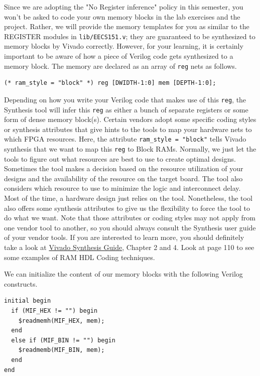 \documentclass[11pt]{article}
\begin{document}
{Since we are adopting the "No Register inference" policy in this semester, you won't be asked to code your own memory blocks in the lab exercises and the project. Rather, we will provide the memory templates for you as similar to the REGISTER modules in \verb|lib/EECS151.v|; they are guaranteed to be synthesized to memory blocks by Vivado correctly. However, for your learning, it is certainly important to be aware of how a piece of Verilog code gets synthesized to a memory block.
The memory are declared as an array of \verb|reg| nets as follows.

\begin{verbatim}
(* ram_style = "block" *) reg [DWIDTH-1:0] mem [DEPTH-1:0];
\end{verbatim}

Depending on how you write your Verilog code that makes use of this \verb|reg|, the Synthesis tool will infer this \verb|reg| as either a bunch of separate registers or some form of dense memory block(s). Certain vendors adopt some specific coding styles or synthesis attributes that give hints to the tools to map your hardware nets to which FPGA resources. Here, the attribute \verb|ram_style = "block"| tells Vivado synthesis that we want to map this \verb|reg| to Block RAMs. Normally, we just let the tools to figure out what resources are best to use to create optimal designs. Sometimes the tool makes a decision based on the resource utilization of your designs and the availability of the resource on the target board. The tool also considers which resource to use to minimize the logic and interconnect delay. Most of the time, a hardware design just relies on the tool. Nonetheless, the tool also offers some synthesis attributes to give us the flexibility to force the tool to do what we want. Note that those attributes or coding styles may not apply from one vendor tool to another, so you should always consult the Synthesis user guide of your vendor tools.
If you are interested to learn more, you should definitely take a look at \href{https://www.xilinx.com/support/documentation/sw_manuals/xilinx2019_2/ug901-vivado-synthesis.pdf}{Vivado Synthesis Guide}, Chapter 2 and 4. Look at page 110 to see some examples of RAM HDL Coding techniques.

We can initialize the content of our memory blocks with the following Verilog constructs.

\begin{verbatim}
initial begin
  if (MIF_HEX != "") begin
    $readmemh(MIF_HEX, mem);
  end
  else if (MIF_BIN != "") begin
    $readmemb(MIF_BIN, mem);
  end
end
\end{verbatim}

}
\end{document}
